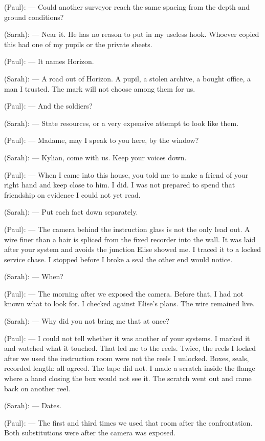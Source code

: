 \begin{room}
(Paul): --- Could another surveyor reach the same spacing from the depth and ground conditions?

(Sarah): --- Near it. He has no reason to put in my useless hook. Whoever copied this had one of my pupils or the private sheets.

(Paul): --- It names Horizon.

(Sarah): --- A road out of Horizon. A pupil, a stolen archive, a bought office, a man I trusted. The mark will not choose among them for us.

(Paul): --- And the soldiers?

(Sarah): --- State resources, or a very expensive attempt to look like them.

(Paul): --- Madame, may I speak to you here, by the window?

(Sarah): --- Kylian, come with us. Keep your voices down.

\centerline{}

(Paul): --- When I came into this house, you told me to make a friend of your right hand and keep close to him. I did. I was not prepared to spend that friendship on evidence I could not yet read.

(Sarah): --- Put each fact down separately.

(Paul): --- The camera behind the instruction glass is not the only lead out. A wire finer than a hair is spliced from the fixed recorder into the wall. It was laid after your system and avoids the junction Elise showed me. I traced it to a locked service chase. I stopped before I broke a seal the other end would notice.

(Sarah): --- When?

(Paul): --- The morning after we exposed the camera. Before that, I had not known what to look for. I checked against Elise's plans. The wire remained live.

(Sarah): --- Why did you not bring me that at once?

(Paul): --- I could not tell whether it was another of your systems. I marked it and watched what it touched. That led me to the reels. Twice, the reels I locked after we used the instruction room were not the reels I unlocked. Boxes, seals, recorded length: all agreed. The tape did not. I made a scratch inside the flange where a hand closing the box would not see it. The scratch went out and came back on another reel.

(Sarah): --- Dates.

(Paul): --- The first and third times we used that room after the confrontation. Both substitutions were after the camera was exposed.


\end{room}
